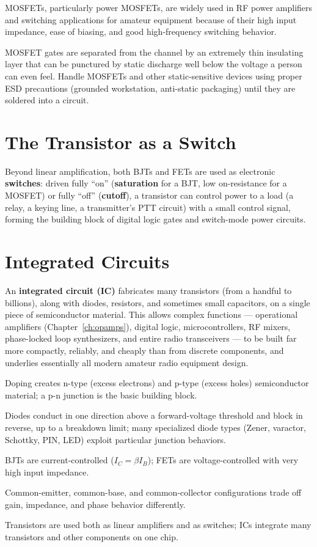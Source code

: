 MOSFETs, particularly power MOSFETs, are widely used in RF power
amplifiers and switching applications for amateur equipment because of
their high input impedance, ease of biasing, and good high-frequency
switching behavior.

\begin{safetynote}
MOSFET gates are separated from the channel by an extremely thin
insulating layer that can be punctured by static discharge well below
the voltage a person can even feel. Handle MOSFETs and other
static-sensitive devices using proper ESD precautions (grounded
workstation, anti-static packaging) until they are soldered into a
circuit.
\end{safetynote}

\section{The Transistor as a Switch}

Beyond linear amplification, both BJTs and FETs are used as electronic
\textbf{switches}: driven fully ``on'' (\textbf{saturation} for a BJT,
low on-resistance for a MOSFET) or fully ``off'' (\textbf{cutoff}), a
transistor can control power to a load (a relay, a keying line, a
transmitter's PTT circuit) with a small control signal, forming the
building block of digital logic gates and switch-mode power circuits.

\section{Integrated Circuits}

An \textbf{integrated circuit (IC)} fabricates many transistors (from a
handful to billions), along with diodes, resistors, and sometimes small
capacitors, on a single piece of semiconductor material. This allows
complex functions --- operational amplifiers (Chapter~\ref{ch:opamps}),
digital logic, microcontrollers, RF mixers, phase-locked loop
synthesizers, and entire radio transceivers --- to be built far more
compactly, reliably, and cheaply than from discrete components, and
underlies essentially all modern amateur radio equipment design.

\begin{quickreview}
\item Doping creates n-type (excess electrons) and p-type (excess holes)
semiconductor material; a p-n junction is the basic building block.
\item Diodes conduct in one direction above a forward-voltage threshold
and block in reverse, up to a breakdown limit; many specialized diode
types (Zener, varactor, Schottky, PIN, LED) exploit particular junction
behaviors.
\item BJTs are current-controlled ($I_C = \beta I_B$); FETs are
voltage-controlled with very high input impedance.
\item Common-emitter, common-base, and common-collector configurations
trade off gain, impedance, and phase behavior differently.
\item Transistors are used both as linear amplifiers and as switches;
ICs integrate many transistors and other components on one chip.
\end{quickreview}

